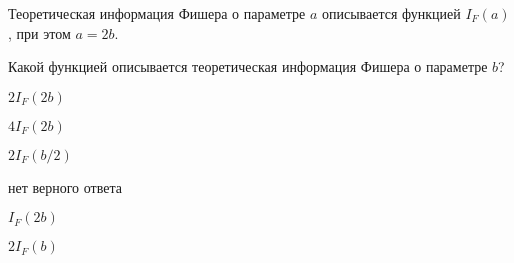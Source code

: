 
\begin{question}
Теоретическая информация Фишера о параметре \(a\) описывается функцией
\(I_F(a)\), при этом \(a = 2b\).

Какой функцией описывается теоретическая информация Фишера о параметре
\(b\)?
\begin{answerlist}
  \item \(2 I_F(2 b)\)
  \item \(4 I_F(2 b)\)
  \item \(2 I_F(b/2)\)
  \item нет верного ответа
  \item \(I_F(2 b)\)
  \item \(2 I_F(b)\)
\end{answerlist}
\end{question}


